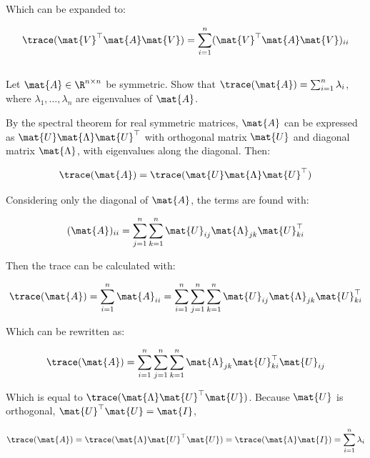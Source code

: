 \documentclass{template}
\begin{document}
Which can be expanded to:

\begin{equation}
    \trace (\mat{V}^\top\mat{A}\mat{V}) = \sum_{i=1}^n (\mat{V}^\top\mat{A}\mat{V})_{ii}
\end{equation}



\subsection{}
Let $\mat{A} \in \R^{n\times n}$ be symmetric. Show that $\trace(\mat{A}) 
= \sum_{i=1}^n \lambda_i$, where $\lambda_1, \ldots, \lambda_n$ are eigenvalues of $\mat{A}$. 

By the spectral theorem for real symmetric matrices, $\mat{A}$ can be expressed as $\mat{U}\mat{\Lambda}\mat{U}^\top$ with orthogonal matrix $\mat{U}$ and diagonal matrix $\mat{\Lambda}$, with eigenvalues along the diagonal. Then:

\begin{equation}
    \trace(\mat{A}) = \trace(\mat{U}\mat{\Lambda}\mat{U}^\top)
\end{equation}

Considering only the diagonal of $\mat{A}$, the terms are found with:

\begin{equation}
    (\mat{A})_{ii} = \sum_{j=1}^n  \sum_{k=1}^n  \mat{U}_{ij}\mat{\Lambda}_{jk}\mat{U}^\top_{ki}
\end{equation}

Then the trace can be calculated with:

\begin{equation}\label{eq:circular_transposition}
    \trace(\mat{A}) = \sum_{i=1}^n \mat{A}_{ii} = \sum_{i=1}^n \sum_{j=1}^n  \sum_{k=1}^n  \mat{U}_{ij}\mat{\Lambda}_{jk}\mat{U}^\top_{ki}
\end{equation}

Which can be rewritten as:

\begin{equation}
    \trace(\mat{A}) = \sum_{i=1}^n \sum_{j=1}^n  \sum_{k=1}^n  \mat{\Lambda}_{jk}\mat{U}^\top_{ki}\mat{U}_{ij}
\end{equation}

Which is equal to $\trace(\mat{\Lambda}\mat{U}^\top\mat{U})$. Because $\mat{U}$ is orthogonal, $\mat{U}^\top\mat{U} = \mat{I}$,

\begin{equation}
    \trace(\mat{A}) = \trace(\mat{\Lambda}\mat{U}^\top\mat{U}) = \trace(\mat{\Lambda}\mat{I}) = \sum_{i=1}^n \lambda_i
\end{equation}
\end{document}
